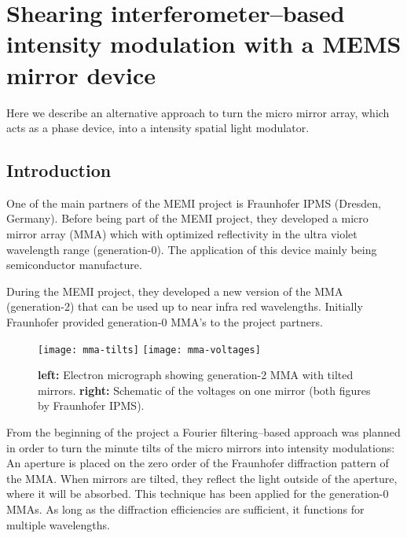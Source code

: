 \chapter{Shearing interferometer--based intensity modulation with a
  MEMS mirror device}
\lstset{language=Maxima}
\begin{summary}
  Here we describe an alternative approach to turn the micro mirror
  array, which acts as a phase device, into a intensity spatial light
  modulator. 
\end{summary}
\section{Introduction}
One of the main partners of the MEMI project is Fraunhofer IPMS
(Dresden, Germany). Before being part of the MEMI project, they
developed a micro mirror array (MMA) which with optimized reflectivity
in the ultra violet wavelength range (generation-0). The application
of this device mainly being semiconductor manufacture.

During the MEMI project, they developed a new version of the MMA
(generation-2) that can be used up to near infra red
wavelengths. Initially Fraunhofer provided generation-0 MMA's to the
project partners.
\begin{figure}[htbp]
  \centering
  \texttt{[image: mma-tilts]}
  \texttt{[image: mma-voltages]}
  \caption{{\bf left:} Electron micrograph showing generation-2 MMA
    with tilted mirrors. {\bf right:} Schematic of the voltages on one
    mirror (both figures by Fraunhofer IPMS).}
  \label{fig:mma-tilts}
\end{figure}
From the beginning of the project a Fourier filtering--based approach
was planned in order to turn the minute tilts of the micro mirrors
into intensity modulations: An aperture is placed on the zero order of
the Fraunhofer diffraction pattern of the MMA. When mirrors are
tilted, they reflect the light outside of the aperture, where it will
be absorbed.  This technique has been applied for the generation-0
MMAs. As long as the diffraction efficiencies are sufficient, it
functions for multiple wavelengths.

